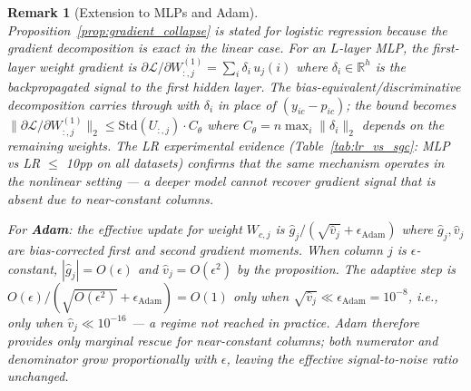 \documentclass[11pt]{article}
\newtheorem{remark}{Remark}
\begin{document}
\begin{remark}[Extension to MLPs and Adam]
\label{rem:mlp_adam}
Proposition~\ref{prop:gradient_collapse} is stated for logistic regression because
the gradient decomposition is exact in the linear case.
For an $L$-layer MLP, the first-layer weight gradient is
$\partial\mathcal{L}/\partial W^{(1)}_{:,j} = \sum_i \delta_i\,u_j(i)$ where
$\delta_i \in \mathbb{R}^h$ is the backpropagated signal to the first hidden layer.
The bias-equivalent/discriminative decomposition carries through with
$\delta_i$ in place of $(y_{ic}-p_{ic})$; the bound becomes
$\|\partial\mathcal{L}/\partial W^{(1)}_{:,j}\|_2 \leq \mathrm{Std}(U_{:,j})\cdot C_\theta$
where $C_\theta = n\max_i\|\delta_i\|_2$ depends on the remaining weights.
The LR experimental evidence (Table~\ref{tab:lr_vs_sgc}: MLP vs LR $\leq$ 10pp
on all datasets) confirms that the same mechanism operates in the nonlinear setting
--- a deeper model cannot recover gradient signal that is absent due to near-constant
columns.

For \textbf{Adam}: the effective update for weight $W_{c,j}$ is
$\hat{g}_j/(\sqrt{\hat{v}_j} + \epsilon_{\mathrm{Adam}})$ where $\hat{g}_j,\hat{v}_j$
are bias-corrected first and second gradient moments.
When column $j$ is $\epsilon$-constant, $|\hat{g}_j| = O(\epsilon)$ and
$\hat{v}_j = O(\epsilon^2)$ by the proposition.
The adaptive step is $O(\epsilon)/(\sqrt{O(\epsilon^2)} + \epsilon_{\mathrm{Adam}})
= O(1)$ only when $\sqrt{\hat{v}_j} \ll \epsilon_{\mathrm{Adam}} = 10^{-8}$,
i.e., only when $\hat{v}_j \ll 10^{-16}$ --- a regime not reached in practice.
Adam therefore provides only marginal rescue for near-constant columns; both
numerator and denominator grow proportionally with $\epsilon$, leaving the
effective signal-to-noise ratio unchanged.
\end{remark}
\end{document}
